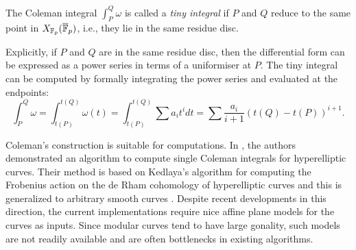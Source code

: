 \begin{defn}\label{def:tiny_integral}
The Coleman integral $\int_P^Q \omega$ is called a \emph{tiny integral} if $P$ and $Q$ reduce to the same point in $X_{\mathbb{F}_p}(\overline{\mathbb{F}}_p)$, i.e., they lie in the same residue disc.

\end{defn}


Explicitly, if $P$ and $Q$ are in the same residue disc, then the differential form can be expressed as a power series in terms of a uniformiser at $P$. The tiny integral can be computed by formally integrating the power series and evaluated at the endpoints: \[\int_P^Q \omega = \int_{t(P)}^{t(Q)} \omega(t) = \int_{t(P)}^{t(Q)}\sum a_i t^i dt= \sum \frac{a_i}{i+1} (t(Q) - t(P))^{i+1}.\]


Coleman’s construction is suitable for computations. In \cite{BBK10}, the authors demonstrated an algorithm to compute single Coleman integrals for hyperelliptic curves. Their method is based on Kedlaya's algorithm for computing the Frobenius action on the de Rham cohomology of hyperelliptic curves \cite{Kedlaya_coho_hyper} and this is generalized to arbitrary smooth curves \cite{balatuit, Tui16, Tui17}. Despite recent developments in this direction, the current implementations require nice affine plane models for the curves as inputs. Since modular curves tend to have large gonality, such models are not readily available and are often bottlenecks in existing algorithms.